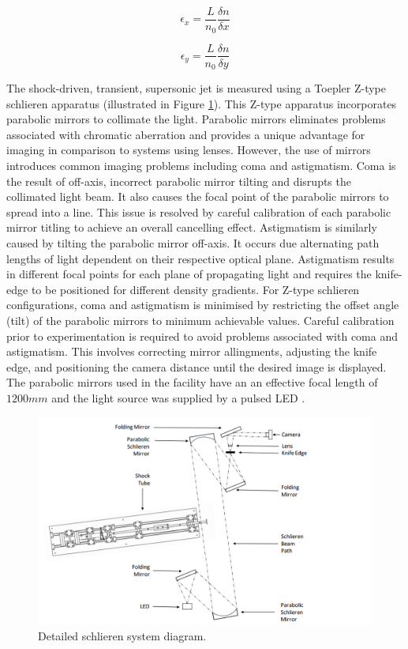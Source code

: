 \begin{equation}\label{eqn:curv_x}
\epsilon_x = \frac{L}{n_0}\frac{\delta n}{\delta x}
\end{equation}

\begin{equation}\label{eqn:curv_y}
\epsilon_y = \frac{L}{n_0}\frac{\delta n}{\delta y}
\end{equation}

The shock-driven, transient, supersonic jet is measured using a Toepler Z-type schlieren apparatus \cite{settles2001schlieren} (illustrated in Figure \ref{fig:schlieren}). This Z-type apparatus incorporates parabolic mirrors to collimate the light. Parabolic mirrors eliminates problems associated with chromatic aberration and provides a unique advantage for imaging in comparison to systems using lenses. However, the use of mirrors introduces common imaging problems including coma and astigmatism. Coma is the result of off-axis, incorrect parabolic mirror tilting and disrupts the collimated light beam. It also causes the focal point of the parabolic mirrors to spread into a line. This issue is resolved by careful calibration of each parabolic mirror titling to achieve an overall cancelling effect.  Astigmatism is similarly caused by tilting the parabolic mirror off-axis. It occurs due alternating path lengths of light dependent on their respective optical plane. Astigmatism results in different focal points for each plane of propagating light and requires the knife-edge to be positioned for different density gradients. For Z-type schlieren configurations, coma and astigmatism is minimised by restricting the offset angle (tilt) of the parabolic mirrors to minimum achievable values. Careful calibration prior to experimentation is required to avoid problems associated with coma and astigmatism. This involves correcting mirror allingments, adjusting the knife edge, and positioning the camera distance until the desired image is displayed. The parabolic mirrors used in the facility have an an effective focal length of $1200mm$ and the light source was supplied by a pulsed LED \cite{willert2012assessment}. 

\begin{figure}[H] 
	\centering
	\includegraphics[width=1\textwidth]{schlieren.png} 
	\caption{Detailed schlieren system diagram.}
	\label{fig:schlieren}
\end{figure}

